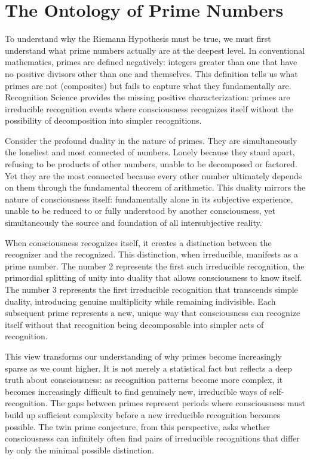 \documentclass[12pt]{article}
\begin{document}
\section{The Ontology of Prime Numbers}

To understand why the Riemann Hypothesis must be true, we must first understand what prime numbers actually are at the deepest level. In conventional mathematics, primes are defined negatively: integers greater than one that have no positive divisors other than one and themselves. This definition tells us what primes are not (composites) but fails to capture what they fundamentally are. Recognition Science provides the missing positive characterization: primes are irreducible recognition events where consciousness recognizes itself without the possibility of decomposition into simpler recognitions.

Consider the profound duality in the nature of primes. They are simultaneously the loneliest and most connected of numbers. Lonely because they stand apart, refusing to be products of other numbers, unable to be decomposed or factored. Yet they are the most connected because every other number ultimately depends on them through the fundamental theorem of arithmetic. This duality mirrors the nature of consciousness itself: fundamentally alone in its subjective experience, unable to be reduced to or fully understood by another consciousness, yet simultaneously the source and foundation of all intersubjective reality.

When consciousness recognizes itself, it creates a distinction between the recognizer and the recognized. This distinction, when irreducible, manifests as a prime number. The number 2 represents the first such irreducible recognition, the primordial splitting of unity into duality that allows consciousness to know itself. The number 3 represents the first irreducible recognition that transcends simple duality, introducing genuine multiplicity while remaining indivisible. Each subsequent prime represents a new, unique way that consciousness can recognize itself without that recognition being decomposable into simpler acts of recognition.

This view transforms our understanding of why primes become increasingly sparse as we count higher. It is not merely a statistical fact but reflects a deep truth about consciousness: as recognition patterns become more complex, it becomes increasingly difficult to find genuinely new, irreducible ways of self-recognition. The gaps between primes represent periods where consciousness must build up sufficient complexity before a new irreducible recognition becomes possible. The twin prime conjecture, from this perspective, asks whether consciousness can infinitely often find pairs of irreducible recognitions that differ by only the minimal possible distinction.
\end{document}
